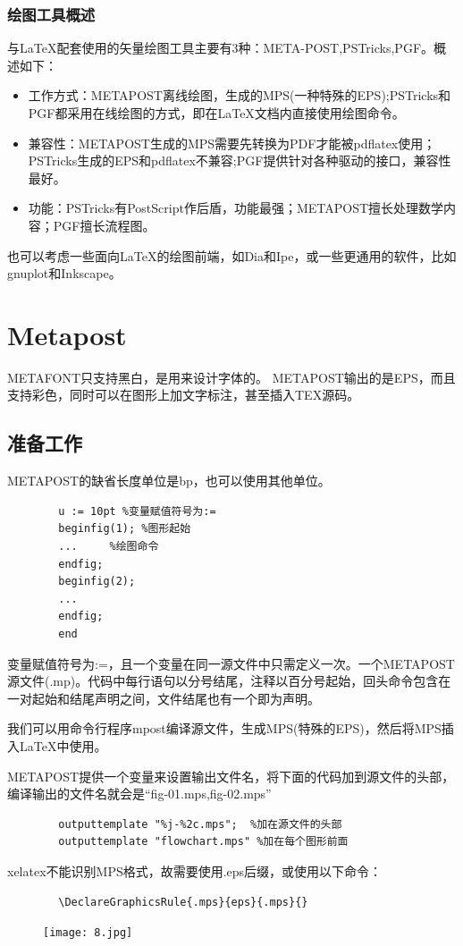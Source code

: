 \documentclass[16pt]{article}
\begin{document}
\subsubsection{绘图工具概述}
   与\LaTeX{}配套使用的矢量绘图工具主要有3种：META-POST,PSTricks,PGF。概述如下： \par
   \begin{itemize}
       \item 工作方式：METAPOST离线绘图，生成的MPS(一种特殊的EPS);PSTricks和PGF都采用在线绘图的方式，即在\LaTeX{}文档内直接使用绘图命令。 
       \item 兼容性：METAPOST生成的MPS需要先转换为PDF才能被pdflatex使用；PSTricks生成的EPS和pdflatex不兼容;PGF提供针对各种驱动的接口，兼容性最好。
       \item 功能：PSTricks有PostScript作后盾，功能最强；METAPOST擅长处理数学内容；PGF擅长流程图。
   \end{itemize} \par
   也可以考虑一些面向\LaTeX{}的绘图前端，如Dia和Ipe，或一些更通用的软件，比如gnuplot和Inkscape。

\section{Metapost}
   METAFONT只支持黑白，是用来设计字体的。 METAPOST输出的是EPS，而且支持彩色，同时可以在图形上加文字标注，甚至插入TEX源码。 \par
   \subsection{准备工作}
    METAPOST的缺省长度单位是bp，也可以使用其他单位。
    \begin{lstlisting}
        u := 10pt %变量赋值符号为:=
        beginfig(1); %图形起始
        ...     %绘图命令
        endfig;
        beginfig(2);
        ...
        endfig;
        end
    \end{lstlisting}\par
    变量赋值符号为:=，且一个变量在同一源文件中只需定义一次。一个METAPOST源文件(.mp)。代码中每行语句以分号结尾，注释以百分号起始，回头命令包含在一对起始和结尾声明之间，文件结尾也有一个即为声明。 \par
    我们可以用命令行程序mpost编译源文件，生成MPS(特殊的EPS)，然后将MPS插入\LaTeX{}中使用。\par
    METAPOST提供一个变量来设置输出文件名，将下面的代码加到源文件的头部，编译输出的文件名就会是“fig-01.mps,fig-02.mps” \par
    \begin{lstlisting}
        outputtemplate "%j-%2c.mps";  %加在源文件的头部
        outputtemplate "flowchart.mps" %加在每个图形前面
    \end{lstlisting}
    xelatex不能识别MPS格式，故需要使用.eps后缀，或使用以下命令： \par
    \begin{lstlisting}
        \DeclareGraphicsRule{.mps}{eps}{.mps}{}
    \end{lstlisting}
    \begin{figure}
        \centering
        \texttt{[image: 8.jpg]}
    \end{figure}
\end{document}
